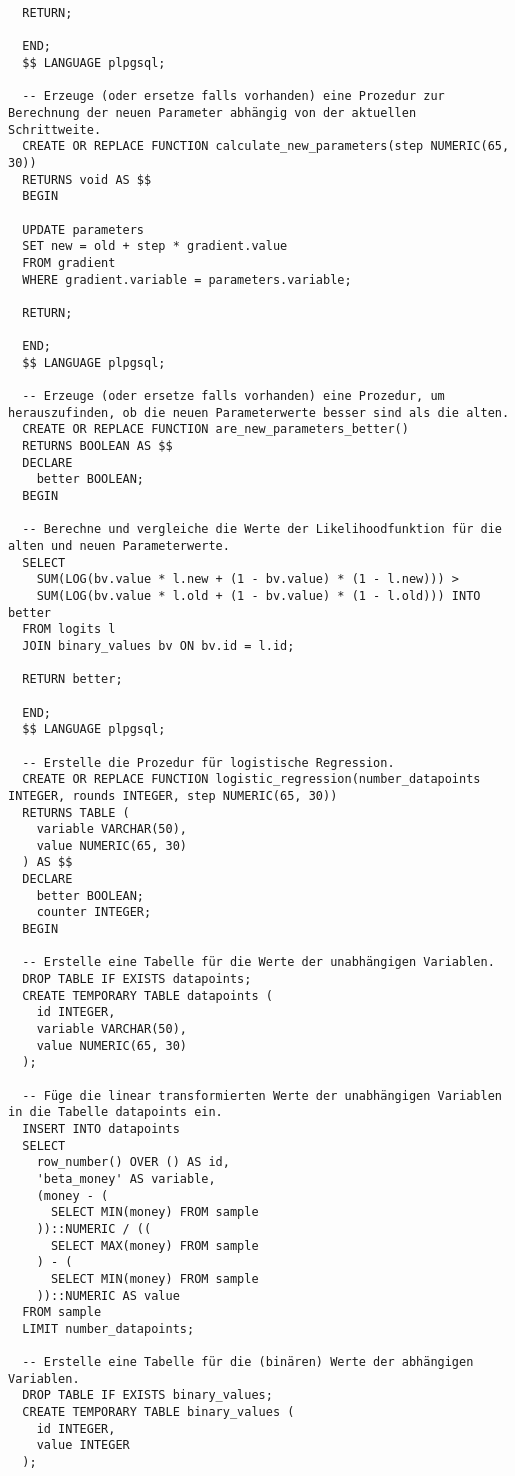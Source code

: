 \begin{verbatim}
  RETURN;

  END;
  $$ LANGUAGE plpgsql;

  -- Erzeuge (oder ersetze falls vorhanden) eine Prozedur zur Berechnung der neuen Parameter abhängig von der aktuellen Schrittweite.
  CREATE OR REPLACE FUNCTION calculate_new_parameters(step NUMERIC(65, 30))
  RETURNS void AS $$
  BEGIN

  UPDATE parameters
  SET new = old + step * gradient.value
  FROM gradient
  WHERE gradient.variable = parameters.variable;

  RETURN;

  END;
  $$ LANGUAGE plpgsql;

  -- Erzeuge (oder ersetze falls vorhanden) eine Prozedur, um herauszufinden, ob die neuen Parameterwerte besser sind als die alten.
  CREATE OR REPLACE FUNCTION are_new_parameters_better()
  RETURNS BOOLEAN AS $$
  DECLARE
    better BOOLEAN;
  BEGIN

  -- Berechne und vergleiche die Werte der Likelihoodfunktion für die alten und neuen Parameterwerte.
  SELECT
    SUM(LOG(bv.value * l.new + (1 - bv.value) * (1 - l.new))) >
    SUM(LOG(bv.value * l.old + (1 - bv.value) * (1 - l.old))) INTO better
  FROM logits l
  JOIN binary_values bv ON bv.id = l.id;

  RETURN better;

  END;
  $$ LANGUAGE plpgsql;

  -- Erstelle die Prozedur für logistische Regression.
  CREATE OR REPLACE FUNCTION logistic_regression(number_datapoints INTEGER, rounds INTEGER, step NUMERIC(65, 30))
  RETURNS TABLE (
    variable VARCHAR(50),
    value NUMERIC(65, 30)
  ) AS $$
  DECLARE
    better BOOLEAN;
    counter INTEGER;
  BEGIN

  -- Erstelle eine Tabelle für die Werte der unabhängigen Variablen.
  DROP TABLE IF EXISTS datapoints;
  CREATE TEMPORARY TABLE datapoints (
    id INTEGER,
    variable VARCHAR(50),
    value NUMERIC(65, 30)
  );

  -- Füge die linear transformierten Werte der unabhängigen Variablen in die Tabelle datapoints ein.
  INSERT INTO datapoints
  SELECT
    row_number() OVER () AS id,
    'beta_money' AS variable,
    (money - (
      SELECT MIN(money) FROM sample
    ))::NUMERIC / ((
      SELECT MAX(money) FROM sample
    ) - (
      SELECT MIN(money) FROM sample
    ))::NUMERIC AS value
  FROM sample
  LIMIT number_datapoints;

  -- Erstelle eine Tabelle für die (binären) Werte der abhängigen Variablen.
  DROP TABLE IF EXISTS binary_values;
  CREATE TEMPORARY TABLE binary_values (
    id INTEGER,
    value INTEGER
  );


\end{verbatim}
